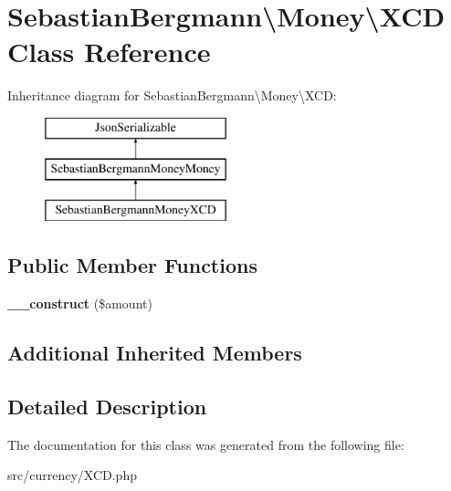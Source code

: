 \hypertarget{classSebastianBergmann_1_1Money_1_1XCD}{}\section{Sebastian\+Bergmann\textbackslash{}Money\textbackslash{}X\+C\+D Class Reference}
\label{classSebastianBergmann_1_1Money_1_1XCD}
Inheritance diagram for Sebastian\+Bergmann\textbackslash{}Money\textbackslash{}X\+C\+D\+:\begin{figure}[H]
\begin{center}
\leavevmode
\includegraphics[height=3.000000cm]{classSebastianBergmann_1_1Money_1_1XCD}
\end{center}
\end{figure}
\subsection*{Public Member Functions}
\begin{DoxyCompactItemize}
\item 
\hypertarget{classSebastianBergmann_1_1Money_1_1XCD_aef4204e14b8a9b3d4e89e5c7a48a2f97}{}{\bfseries \+\_\+\+\_\+construct} (\$amount)\label{classSebastianBergmann_1_1Money_1_1XCD_aef4204e14b8a9b3d4e89e5c7a48a2f97}

\end{DoxyCompactItemize}
\subsection*{Additional Inherited Members}


\subsection{Detailed Description}


The documentation for this class was generated from the following file\+:\begin{DoxyCompactItemize}
\item 
src/currency/X\+C\+D.\+php\end{DoxyCompactItemize}
